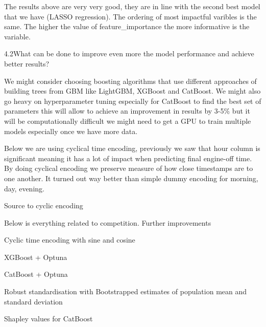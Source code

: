 \documentclass[11pt]{article}
\begin{document}
    The results above are very very good, they are in line with the second
best model that we have (LASSO regression). The ordering of most
impactful varibles is the same. The higher the value of
feature\_importance the more informative is the variable.

    4.2What can be done to improve even more the model performance and
achieve better results?

We might consider choosing boosting algorithms that use different
approaches of building trees from GBM like LightGBM, XGBoost and
CatBoost. We might also go heavy on hyperparameter tuning especially for
CatBoost to find the best set of parameters this will allow to achieve
an improvement in results by 3-5\% but it will be computationally
difficult we might need to get a GPU to train multiple models especially
once we have more data.

Below we are using cyclical time encoding, previously we saw that hour
column is significant meaning it has a lot of impact when predicting
final engine-off time. By doing cyclical encoding we preserve measure of
how close timestamps are to one another. It turned out way better than
simple dummy encoding for morning, day, evening.

Source to cyclic encoding

    Below is everything related to competition. Further improvements

Cyclic time encoding with sine and cosine

XGBoost + Optuna

CatBoost + Optuna

Robust standardisation with Bootstrapped estimates of population mean
and standard deviation

Shapley values for CatBoost
\end{document}
